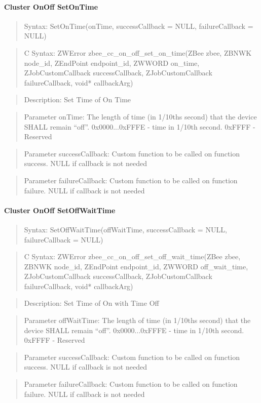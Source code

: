 \paragraph{Cluster OnOff SetOnTime}
\begin{quote}Syntax: SetOnTime(onTime, successCallback = NULL, failureCallback = NULL)\end{quote}
\begin{quote}C Syntax: ZWError zbee\_cc\_on\_off\_set\_on\_time(ZBee zbee, ZBNWK node\_id, ZEndPoint endpoint\_id, ZWWORD on\_time, ZJobCustomCallback successCallback, ZJobCustomCallback failureCallback, void* callbackArg)\end{quote}
\begin{quote}Description: Set Time of On Time\end{quote}
\begin{quote}Parameter onTime: The length of time (in 1/10ths second) that the device SHALL remain “off”. 0x0000...0xFFFE - time in 1/10th second. 0xFFFF          - Reserved\end{quote}
\begin{quote}Parameter successCallback: Custom function to be called on function success. NULL if callback is not needed\end{quote}
\begin{quote}Parameter failureCallback: Custom function to be called on function failure. NULL if callback is not needed\end{quote}


\paragraph{Cluster OnOff SetOffWaitTime}
\begin{quote}Syntax: SetOffWaitTime(offWaitTime, successCallback = NULL, failureCallback = NULL)\end{quote}
\begin{quote}C Syntax: ZWError zbee\_cc\_on\_off\_set\_off\_wait\_time(ZBee zbee, ZBNWK node\_id, ZEndPoint endpoint\_id, ZWWORD off\_wait\_time, ZJobCustomCallback successCallback, ZJobCustomCallback failureCallback, void* callbackArg)\end{quote}
\begin{quote}Description: Set Time of On with Time Off\end{quote}
\begin{quote}Parameter offWaitTime: The length of time (in 1/10ths second) that the device SHALL remain “off”. 0x0000...0xFFFE - time in 1/10th second. 0xFFFF          - Reserved\end{quote}
\begin{quote}Parameter successCallback: Custom function to be called on function success. NULL if callback is not needed\end{quote}
\begin{quote}Parameter failureCallback: Custom function to be called on function failure. NULL if callback is not needed\end{quote}


